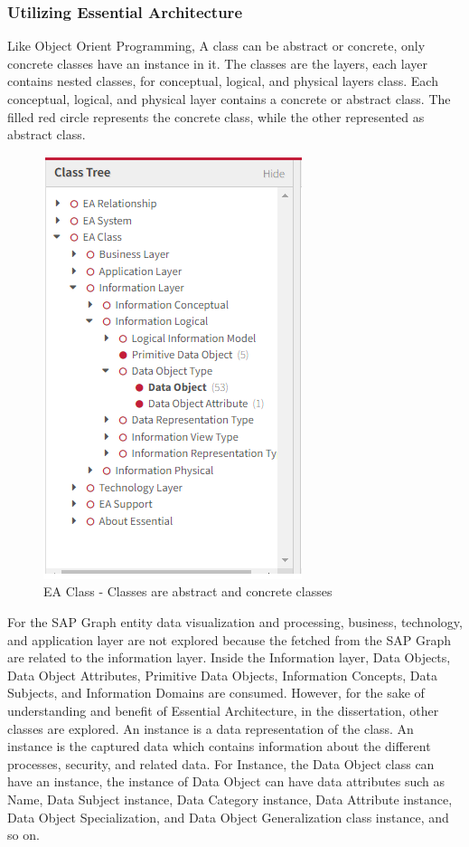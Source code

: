 \documentclass{article}
\begin{document}
\maketitle
\subsubsection{Utilizing Essential Architecture}

Like Object Orient Programming, A class can be abstract or concrete, only concrete classes have an instance in it. The classes are the layers, each layer contains nested classes, for conceptual, logical, and physical layers class. Each conceptual, logical, and physical layer contains a concrete or abstract class. The filled red circle represents the concrete class, while the other represented as abstract class.

\begin{figure}[ht!]
    \centering
    \includegraphics[scale=0.8]{ea-class}
    \caption{EA Class  - 
Classes are abstract and concrete classes }
    \label{fig:ea-class}
\end{figure}

For the SAP Graph entity data visualization and processing, business, technology, and application layer are not explored because the fetched from the SAP Graph are related to the information layer. Inside the Information layer, Data Objects, Data Object Attributes, Primitive Data Objects, Information Concepts, Data Subjects, and Information Domains are consumed. However, for the sake of understanding and benefit of Essential Architecture, in the dissertation, other classes are explored. An instance is a data representation of the class. An instance is the captured data which contains information about the different processes, security, and related data. For Instance, the Data Object class can have an instance, the instance of Data Object can have data attributes such as Name, Data Subject instance, Data Category instance, Data Attribute instance, Data Object Specialization, and Data Object Generalization class instance, and so on.
\end{document}

